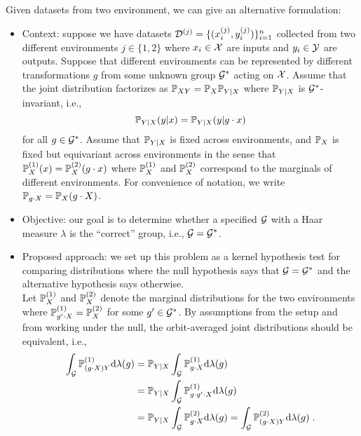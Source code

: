 Given datasets from two environment, we can give an alternative formulation:

\begin{itemize}

\item
Context: suppose we have datasets $\mathcal{D}^{(j)}=\{(x_i^{(j)},y_i^{(j)})\}_{i=1}^n$ collected from two different environments $j\in\{1,2\}$ where $x_i\in\mathcal{X}$ are inputs and $y_i\in\mathcal{Y}$ are outputs. Suppose that different environments can be represented by different transformations $g$ from some unknown group $\mathcal{G}^*$ acting on $\mathcal{X}$. Assume that the joint distribution factorizes as $\mathbb{P}_{XY}=\mathbb{P}_X\mathbb{P}_{Y|X}$ where $\mathbb{P}_{Y|X}$ is $\mathcal{G}^*$-invariant, i.e.,
\[
\mathbb{P}_{Y|X}(y|x) = \mathbb{P}_{Y|X}(y|g\cdot x)
\]
for all $g\in\mathcal{G}^*$. Assume that $\mathbb{P}_{Y|X}$ is fixed across environments, and $\mathbb{P}_X$ is fixed but equivariant across environments in the sense that $\mathbb{P}_X^{(1)}(x)=\mathbb{P}_X^{(2)}(g\cdot x)$ where $\mathbb{P}_X^{(1)}$ and $\mathbb{P}_X^{(2)}$ correspond to the marginals of different environments. For convenience of notation, we write $\mathbb{P}_{g\cdot X}=\mathbb{P}_X(g\cdot X)$.

\item
Objective: our goal is to determine whether a specified $\mathcal{G}$ with a Haar measure $\lambda$ is the ``correct'' group, i.e., $\mathcal{G}=\mathcal{G}^*$.

\iffalse
\todo If so, then the conditional distribution $\mathbb{P}_{Y|X}$ is invariant to, i.e., whether
\[
\bbP_{Y|X} = \bbP_{Y|g\cdot X}
\]
for all $g\in\calG$ and $X\in\calX$.
\fi

\item
Proposed approach: we set up this problem as a kernel hypothesis test for comparing distributions where the null hypothesis says that $\mathcal{G}=\mathcal{G}^*$ and the alternative hypothesis says otherwise.
\\

Let $\mathbb{P}_X^{(1)}$ and $\mathbb{P}_X^{(2)}$ denote the marginal distributions for the two environments where $\mathbb{P}_{g'\cdot X}^{(1)}=\mathbb{P}_X^{(2)}$ for some $g'\in\mathcal{G}^*$. By assumptions from the setup and from working under the null, the orbit-averaged joint distributions should be equivalent, i.e.,
\begin{align*}
\int_{\mathcal{G}}\mathbb{P}_{(g\cdot X)Y}^{(1)}\mathrm{d}\lambda(g) &=
\mathbb{P}_{Y|X}\int_{\mathcal{G}}\mathbb{P}_{g\cdot X}^{(1)}\mathrm{d}\lambda(g) \\
&= \mathbb{P}_{Y|X}\int_{\mathcal{G}}\mathbb{P}_{g\cdot g'\cdot X}^{(1)}\mathrm{d}\lambda(g) \\
&= \mathbb{P}_{Y|X}\int_{\mathcal{G}}\mathbb{P}_{g\cdot X}^{(2)}\mathrm{d}\lambda(g) = \int_{\mathcal{G}}\mathbb{P}_{(g\cdot X)Y}^{(2)}\mathrm{d}\lambda(g) \;.
\end{align*}


\end{itemize}
